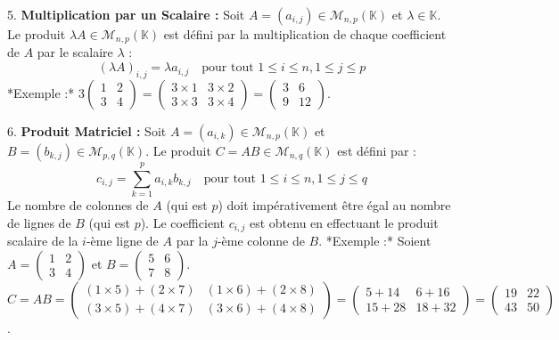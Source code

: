 \documentclass[12pt,a4paper]{report}
\begin{document}
5.  \textbf{Multiplication par un Scalaire :} Soit $A = (a_{i,j}) \in \mathcal{M}_{n,p}(\mathbb{K})$ et $\lambda \in \mathbb{K}$. Le produit $\lambda A \in \mathcal{M}_{n,p}(\mathbb{K})$ est défini par la multiplication de chaque coefficient de $A$ par le scalaire $\lambda$ :
    $$(\lambda A)_{i,j} = \lambda a_{i,j} \quad \text{pour tout } 1 \le i \le n, 1 \le j \le p$$
    *Exemple :* $3 \begin{pmatrix} 1 & 2 \\ 3 & 4 \end{pmatrix} = \begin{pmatrix} 3 \times 1 & 3 \times 2 \\ 3 \times 3 & 3 \times 4 \end{pmatrix} = \begin{pmatrix} 3 & 6 \\ 9 & 12 \end{pmatrix}$.

6.  \textbf{Produit Matriciel :} Soit $A = (a_{i,k}) \in \mathcal{M}_{n,p}(\mathbb{K})$ et $B = (b_{k,j}) \in \mathcal{M}_{p,q}(\mathbb{K})$. Le produit $C = AB \in \mathcal{M}_{n,q}(\mathbb{K})$ est défini par :
    $$c_{i,j} = \sum_{k=1}^p a_{i,k} b_{k,j} \quad \text{pour tout } 1 \le i \le n, 1 \le j \le q$$
    Le nombre de colonnes de $A$ (qui est $p$) doit impérativement être égal au nombre de lignes de $B$ (qui est $p$). Le coefficient $c_{i,j}$ est obtenu en effectuant le produit scalaire de la $i$-ème ligne de $A$ par la $j$-ème colonne de $B$.
    *Exemple :* Soient $A = \begin{pmatrix} 1 & 2 \\ 3 & 4 \end{pmatrix}$ et $B = \begin{pmatrix} 5 & 6 \\ 7 & 8 \end{pmatrix}$.
    $C = AB = \begin{pmatrix} (1 \times 5) + (2 \times 7) & (1 \times 6) + (2 \times 8) \\ (3 \times 5) + (4 \times 7) & (3 \times 6) + (4 \times 8) \end{pmatrix} = \begin{pmatrix} 5+14 & 6+16 \\ 15+28 & 18+32 \end{pmatrix} = \begin{pmatrix} 19 & 22 \\ 43 & 50 \end{pmatrix}$.
\end{document}
